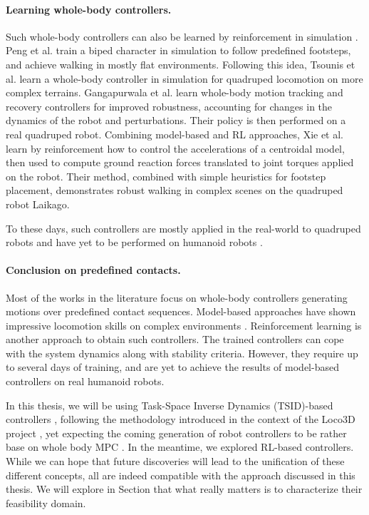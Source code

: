 \paragraph{Learning whole-body controllers.}
Such whole-body controllers can also be learned by reinforcement in simulation \cite{ALLSTEPS_2020}.
Peng et al. \cite{deepLoco} train a biped character in simulation to follow predefined footsteps, and achieve walking in mostly flat environments.
Following this idea, Tsounis et al. \cite{deepGait} learn a whole-body controller in simulation for quadruped locomotion on more complex terrains. 
Gangapurwala et al. \cite{RLOC} learn whole-body motion tracking and recovery controllers for improved robustness, accounting for changes in the dynamics of the robot and perturbations. Their policy is then performed on a real quadruped robot.
Combining model-based and RL approaches, Xie et al. \cite{glide_xie_2021} learn by reinforcement how to control the accelerations of a centroidal model, then used to compute ground reaction forces translated to joint torques applied on the robot.
Their method, combined with simple heuristics for footstep placement, demonstrates robust walking in complex scenes on the quadruped robot Laikago. %

To these days, such controllers are mostly applied in the real-world to quadruped robots and have yet to be performed on humanoid robots \cite{papier_rohan_wbc_rl_2022}.

\paragraph{Conclusion on predefined contacts.}
Most of the works in the literature focus on whole-body controllers generating motions over predefined contact sequences.
Model-based approaches have shown impressive locomotion skills on complex environments \cite{ladder_robot_2}.
Reinforcement learning is another approach to obtain such controllers. 
The trained controllers can cope with the system dynamics along with stability criteria. 
However, they require up to several days of training, and are yet to achieve the results of model-based controllers on real humanoid robots.

In this thesis, we will be using Task-Space Inverse Dynamics (TSID)-based controllers \cite{tsid_prete}, following the methodology introduced in the context of the Loco3D project \cite{loco3d}, yet expecting the coming generation of robot controllers to be rather base on whole body MPC \cite{ewen_2022}.
In the meantime, we explored RL-based controllers.
While we can hope that future discoveries will lead to the unification of these different concepts, all are indeed compatible with the approach discussed in this thesis.
We will explore in Section \cite{sota2} that what really matters is to characterize their feasibility domain. 

